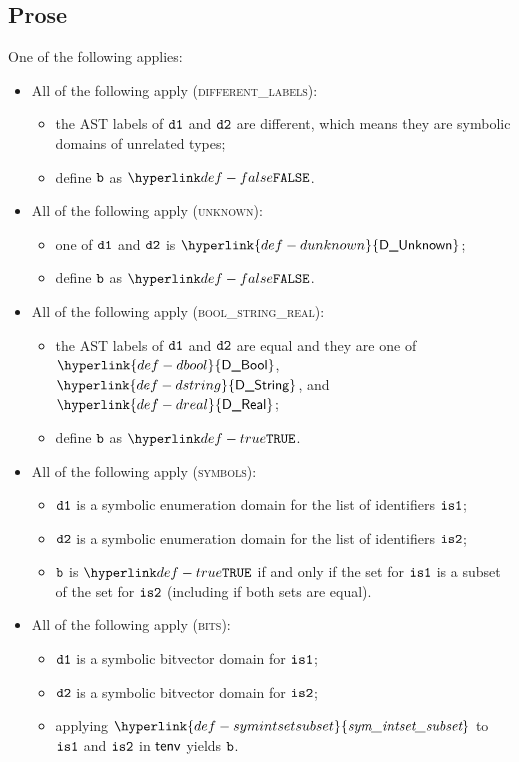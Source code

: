 \documentclass{book}
\newcommand\DBool[0]{\hyperlink{def-dbool}{\textsf{D\_Bool}}}
\newcommand\DString[0]{\hyperlink{def-dstring}{\textsf{D\_String}}}
\newcommand\DReal[0]{\hyperlink{def-dreal}{\textsf{D\_Real}}}
\newcommand\DUnknown[0]{\hyperlink{def-dunknown}{\textsf{D\_Unknown}}}
\newcommand\symintsetsubset[0]{\hyperlink{def-symintsetsubset}{\textfunc{sym\_intset\_subset}}}
\begin{document}
\subsection{Prose}
One of the following applies:
\begin{itemize}
  \item All of the following apply (\textsc{different\_labels}):
  \begin{itemize}
    \item the AST labels of $\texttt{d1}$ and $\texttt{d2}$ are different, which means they are symbolic domains of unrelated types;
    \item define $\texttt{b}$ as $\False$.
  \end{itemize}

  \item All of the following apply (\textsc{unknown}):
  \begin{itemize}
    \item one of $\texttt{d1}$ and $\texttt{d2}$ is $\DUnknown$;
    \item define $\texttt{b}$ as $\False$.
  \end{itemize}

  \item All of the following apply (\textsc{bool\_string\_real}):
  \begin{itemize}
    \item the AST labels of $\texttt{d1}$ and $\texttt{d2}$ are equal and they are one of $\DBool$, $\DString$, and $\DReal$;
    \item define $\texttt{b}$ as $\True$.
  \end{itemize}

  \item All of the following apply (\textsc{symbols}):
  \begin{itemize}
    \item $\texttt{d1}$ is a symbolic enumeration domain for the list of identifiers $\texttt{is1}$;
    \item $\texttt{d2}$ is a symbolic enumeration domain for the list of identifiers $\texttt{is2}$;
    \item $\texttt{b}$ is $\True$ if and only if the set for $\texttt{is1}$ is a subset of the set for $\texttt{is2}$ (including if both sets are equal).
  \end{itemize}

  \item All of the following apply (\textsc{bits}):
  \begin{itemize}
    \item $\texttt{d1}$ is a symbolic bitvector domain for $\texttt{is1}$;
    \item $\texttt{d2}$ is a symbolic bitvector domain for $\texttt{is2}$;
    \item applying $\symintsetsubset$ to $\texttt{is1}$ and $\texttt{is2}$ in $\textsf{tenv}$ yields $\texttt{b}$.
  \end{itemize}


\end{itemize}
\end{document}
